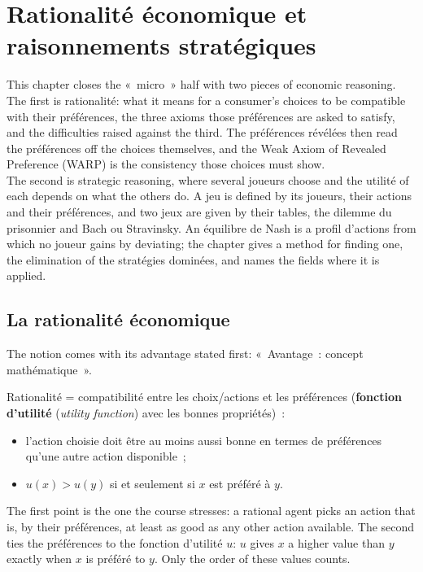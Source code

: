 \section{Rationalité économique et raisonnements stratégiques}

This chapter closes the «~micro~» half with two pieces of economic reasoning. The
first is rationalité: what it means for a consumer's choices to be compatible with
their préférences, the three axioms those préférences are asked to satisfy, and the
difficulties raised against the third. The préférences révélées then read the
préférences off the choices themselves, and the Weak Axiom of Revealed Preference
(WARP) is the consistency those choices must show.\\

The second is strategic reasoning, where several joueurs choose and the utilité of
each depends on what the others do. A jeu is defined by its joueurs, their actions
and their préférences, and two jeux are given by their tables, the dilemme du
prisonnier and Bach ou Stravinsky. An équilibre de Nash is a profil d'actions from
which no joueur gains by deviating; the chapter gives a method for finding one, the
elimination of the stratégies dominées, and names the fields where it is applied.

\subsection{La rationalité économique}

The notion comes with its advantage stated first: «~Avantage~: concept
mathématique~».

\begin{definition}
  Rationalité = compatibilité entre les choix/actions et les préférences
  (\textbf{fonction d'utilité} (\textit{utility function}) avec les bonnes
  propriétés)~:
  \begin{itemize}
    \item l'action choisie doit être au moins aussi bonne en termes de préférences
      qu'une autre action disponible~;
    \item $u(x) > u(y)$ si et seulement si $x$ est préféré à $y$.
  \end{itemize}
\end{definition}

The first point is the one the course stresses: a rational agent picks an action
that is, by their préférences, at least as good as any other action available. The
second ties the préférences to the fonction d'utilité $u$: $u$ gives $x$ a higher
value than $y$ exactly when $x$ is préféré to $y$. Only the order of these values
counts.

